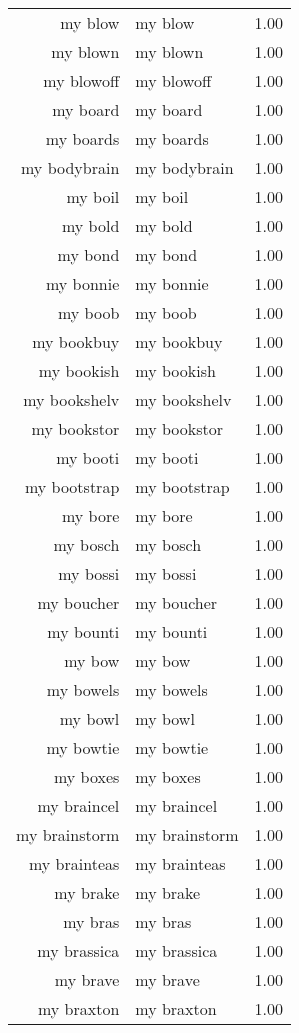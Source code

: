 \begin{table}[ht]
\begin{tabular}{rlr}
  my blow & my blow & 1.00 \\ 
  my blown & my blown & 1.00 \\ 
  my blowoff & my blowoff & 1.00 \\ 
  my board & my board & 1.00 \\ 
  my boards & my boards & 1.00 \\ 
  my bodybrain & my bodybrain & 1.00 \\ 
  my boil & my boil & 1.00 \\ 
  my bold & my bold & 1.00 \\ 
  my bond & my bond & 1.00 \\ 
  my bonnie & my bonnie & 1.00 \\ 
  my boob & my boob & 1.00 \\ 
  my bookbuy & my bookbuy & 1.00 \\ 
  my bookish & my bookish & 1.00 \\ 
  my bookshelv & my bookshelv & 1.00 \\ 
  my bookstor & my bookstor & 1.00 \\ 
  my booti & my booti & 1.00 \\ 
  my bootstrap & my bootstrap & 1.00 \\ 
  my bore & my bore & 1.00 \\ 
  my bosch & my bosch & 1.00 \\ 
  my bossi & my bossi & 1.00 \\ 
  my boucher & my boucher & 1.00 \\ 
  my bounti & my bounti & 1.00 \\ 
  my bow & my bow & 1.00 \\ 
  my bowels & my bowels & 1.00 \\ 
  my bowl & my bowl & 1.00 \\ 
  my bowtie & my bowtie & 1.00 \\ 
  my boxes & my boxes & 1.00 \\ 
  my braincel & my braincel & 1.00 \\ 
  my brainstorm & my brainstorm & 1.00 \\ 
  my brainteas & my brainteas & 1.00 \\ 
  my brake & my brake & 1.00 \\ 
  my bras & my bras & 1.00 \\ 
  my brassica & my brassica & 1.00 \\ 
  my brave & my brave & 1.00 \\ 
  my braxton & my braxton & 1.00 \\ 

\end{tabular}
\end{table}
